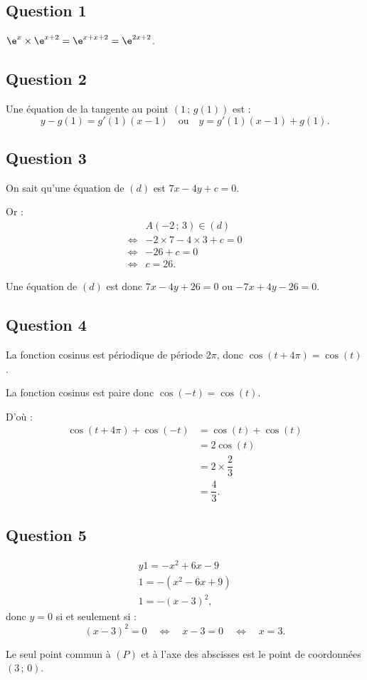 \subsection*{Question 1}

\(\e^x \times \e^{x + 2} = \e^{x + x + 2} = \e^{2x + 2}\).

\subsection*{Question 2}

Une équation de la tangente au point \((1 \,;\, g(1))\) est :
\[
y - g(1) = g'(1)(x - 1) \quad \text{ou} \quad y = g'(1)(x - 1) + g(1).
\]

\subsection*{Question 3}

On sait qu'une équation de \((d)\) est \(7x - 4y + c = 0\).

Or :
\begin{align*}
&A(-2\,;\,3) \in (d) \\
\iff &-2 \times 7 - 4 \times 3 + c = 0 \\
\iff &-26 + c = 0 \\
\iff &c = 26.
\end{align*}

Une équation de \((d)\) est donc \(7x - 4y + 26 = 0\) ou \(-7x + 4y - 26 = 0\).

\subsection*{Question 4}

La fonction cosinus est périodique de période \(2\pi\), donc \(\cos(t + 4\pi) = \cos(t)\).

La fonction cosinus est paire donc \(\cos(-t) = \cos(t)\).

D'où :
\begin{align*}
\cos(t + 4\pi) + \cos(-t) &= \cos(t) + \cos(t) \\
&= 2\cos(t) \\
&= 2 \times \dfrac{2}{3} \\
&= \dfrac{4}{3}.
\end{align*}

\subsection*{Question 5}

\begin{align*}
y 1= -x^2 + 6x - 9 \\
1= -(x^2 - 6x + 9) \\
1= -(x - 3)^2,
\end{align*}
donc \(y = 0\) si et seulement si :
\[
(x - 3)^2 = 0 \quad \iff \quad x - 3 = 0 \quad \iff \quad x = 3.
\]

Le seul point commun à \((P)\) et à l'axe des abscisses est le point de coordonnées \((3 \,;\, 0)\).
